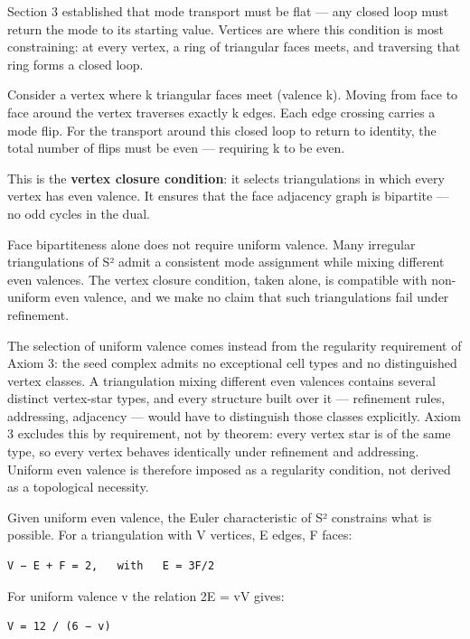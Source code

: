 \documentclass[
  11pt,
  a4paper,
]{article}
\begin{document}
Section 3 established that mode transport must be flat --- any closed
loop must return the mode to its starting value. Vertices are where this
condition is most constraining: at every vertex, a ring of triangular
faces meets, and traversing that ring forms a closed loop.

Consider a vertex where k triangular faces meet (valence k). Moving from
face to face around the vertex traverses exactly k edges. Each edge
crossing carries a mode flip. For the transport around this closed loop
to return to identity, the total number of flips must be even ---
requiring k to be even.

This is the \textbf{vertex closure condition}: it selects triangulations
in which every vertex has even valence. It ensures that the face
adjacency graph is bipartite --- no odd cycles in the dual.

Face bipartiteness alone does not require uniform valence. Many
irregular triangulations of S² admit a consistent mode assignment while
mixing different even valences. The vertex closure condition, taken
alone, is compatible with non-uniform even valence, and we make no claim
that such triangulations fail under refinement.

The selection of uniform valence comes instead from the regularity
requirement of Axiom 3: the seed complex admits no exceptional cell
types and no distinguished vertex classes. A triangulation mixing
different even valences contains several distinct vertex-star types, and
every structure built over it --- refinement rules, addressing,
adjacency --- would have to distinguish those classes explicitly. Axiom
3 excludes this by requirement, not by theorem: every vertex star is of
the same type, so every vertex behaves identically under refinement and
addressing. Uniform even valence is therefore imposed as a regularity
condition, not derived as a topological necessity.

Given uniform even valence, the Euler characteristic of S² constrains
what is possible. For a triangulation with V vertices, E edges, F faces:

\begin{verbatim}
V − E + F = 2,   with   E = 3F/2
\end{verbatim}

For uniform valence v the relation 2E = vV gives:

\begin{verbatim}
V = 12 / (6 − v)
\end{verbatim}
\end{document}

